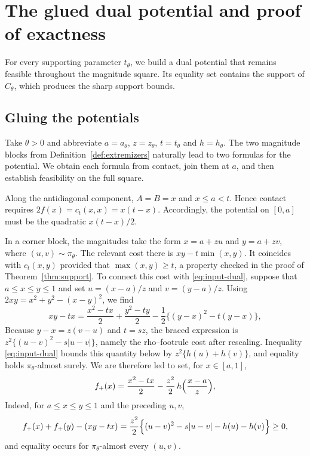 \documentclass{article}
\theoremstyle{definition}
\theoremstyle{remark}
\newcommand{\1}{\mathds{1}}
\begin{document}
\section{The glued dual potential and proof of exactness}\label{sec:proof}

For every supporting parameter $t_\theta$, we build a dual potential
that remains feasible throughout the magnitude square. Its equality set
contains the support of $C_\theta$, which produces the sharp support bounds.

\subsection{Gluing the potentials}\label{sec:gluing}

Take $\theta>0$ and abbreviate
$a=a_\theta$, $z=z_\theta$, $t=t_\theta$ and $h=h_\theta$.
The two magnitude blocks from Definition~\ref{def:extremizers} naturally
lead to two formulas for the potential. We obtain each formula from
contact, join them at $a$, and then establish feasibility on the full square.

Along the antidiagonal component, $A=B=x$ and $x\le a<t$. Hence contact requires $2f(x)=c_t(x,x)=x(t-x)$.
Accordingly, the potential on $[0,a]$ must be the quadratic $x(t-x)/2$.

In a corner block, the magnitudes take the form $x=a+zu$ and $y=a+zv$, where $(u,v)\sim\pi_\theta$. The relevant cost there is $xy-t\min(x,y)$. It coincides with $c_t(x,y)$ provided that $\max(x,y)\ge t$, a property checked in the proof of Theorem~\ref{thm:support}.
To connect this cost with \eqref{eq:input-dual}, suppose that $a\le x\le y\le1$ and set $u=(x-a)/z$ and $v=(y-a)/z$.
Using $2xy=x^2+y^2-(x-y)^2$, we find
\[
	xy-tx=\frac{x^2-tx}{2}+\frac{y^2-ty}{2}-\frac12\bigl\{(y-x)^2-t(y-x)\bigr\},
\]
Because $y-x=z(v-u)$ and $t=sz$, the braced expression is $z^2\{(u-v)^2-s|u-v|\}$, namely the rho--footrule cost after rescaling.
Inequality \eqref{eq:input-dual} bounds this quantity below by $z^2\{h(u)+h(v)\}$, and equality holds $\pi_\theta$-almost surely.
We are therefore led to set, for $x\in[a,1]$,
\begin{equation}\label{eq:upper-potential}
	f_+(x)=\frac{x^2-tx}{2}-\frac{z^2}{2}\,h\Bigl(\frac{x-a}{z}\Bigr),
\end{equation}
Indeed, for $a\le x\le y\le1$ and the preceding $u,v$,
\begin{equation}\label{eq:positive-branch}
	f_+(x)+f_+(y)-(xy-tx)=\frac{z^2}{2}\Bigl\{(u-v)^2-s|u-v|-h(u)-h(v)\Bigr\}\ge0,
\end{equation}
and equality occurs for $\pi_\theta$-almost every $(u,v)$.
\end{document}
